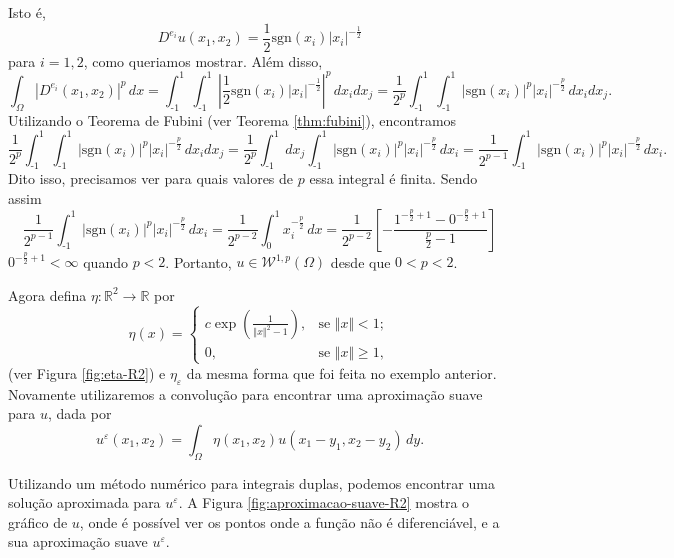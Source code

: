 \documentclass[a4paper, 11pt]{book}
\theoremstyle{definition}
\newcommand{\bR}{\mathbb{R}}
\newcommand{\cW}{\mathcal{W}}
\newcommand{\sgn}{\mathrm{sgn}}
\begin{document}
\begin{ex}
\[    \]
    Isto é,
    \[
        D^{e_i} u(x_1,x_2) = \frac{1}{2}\sgn(x_i) |x_i|^{-\frac{1}{2}}
    \]
    para $i = 1,2$, como queriamos mostrar.
    Além disso,
    \[
        \int_\Omega |D^{e_i} (x_1,x_2)|^p \, dx = \int_{\text{-}1}^1 \int_{\text{-}1}^1 \left| \frac{1}{2} \sgn(x_i) |x_i|^{-\frac{1}{2}} \right|^p \, dx_i dx_j = \frac{1}{2^p}\int_{\text{-}1}^1 \int_{\text{-}1}^1 |\sgn(x_i)|^p |x_i|^{-\frac{p}{2}} \,dx_i dx_j.
    \]
    Utilizando o Teorema de Fubini (ver Teorema \ref{thm:fubini}), encontramos
    {\small
    \[
        \frac{1}{2^p}\int_{\text{-}1}^1\int_{\text{-}1}^1 |\sgn(x_i)|^p |x_i|^{-\frac{p}{2}} \,dx_i dx_j = \frac{1}{2^p}\int_{\text{-}1}^1 dx_j \int_{\text{-}1}^1 |\sgn(x_i)|^p |x_i|^{-\frac{p}{2}} \,dx_i = \frac{1}{2^{p-1}} \int_{\text{-}1}^1 |\sgn(x_i)|^p |x_i|^{-\frac{p}{2}} \,dx_i.
    \]}\!
    Dito isso, precisamos ver para quais valores de $p$ essa integral é finita. Sendo assim
    \[
        \frac{1}{2^{p-1}} \int_{\text{-}1}^1 |\sgn(x_i)|^p |x_i|^{-\frac{p}{2}} \,dx_i = \frac{1}{2^{p-2}}\int_0^1 x_i^{-\frac{p}{2}} \,dx = \frac{1}{2^{p-2}} \left[ -\frac{1^{-\frac{p}{2}+1} - 0^{-\frac{p}{2}+1}}{\tfrac{p}{2} - 1} \right]
    \]
    $0^{-\frac{p}{2} + 1} < \infty$ quando $p < 2$. Portanto, $u \in \cW^{1,p}(\Omega)$ desde que $0 < p < 2$.

    Agora defina $\eta: \bR^2 \to \bR$ por
    \[
        \eta(x) = 
        \left\{ 
            \begin{array}{lr}
                c \exp\left(\frac{1}{\Vert x \Vert^2 - 1} \right), & \text{se } \Vert x \Vert < 1;\\
                0, & \text{se } \Vert x \Vert \geqslant 1,
            \end{array}
        \right.
    \]
    (ver Figura \ref{fig:eta-R2}) e $\eta_\varepsilon$ da mesma forma que foi feita no exemplo anterior. Novamente utilizaremos a convolução para encontrar uma aproximação suave para $u$, dada por
    \[
        u^{\varepsilon}(x_1,x_2) = \int_\Omega \eta(x_1,x_2) u(x_1 - y_1, x_2 - y_2) \,dy.
    \]

    Utilizando um método numérico para integrais duplas, podemos encontrar uma solução aproximada para $u^\varepsilon$.
    A Figura \ref{fig:aproximacao-suave-R2} mostra o gráfico de $u$, onde é possível ver os pontos onde a função não é diferenciável, e a sua aproximação suave $u^\varepsilon$.


\end{ex}
\end{document}
